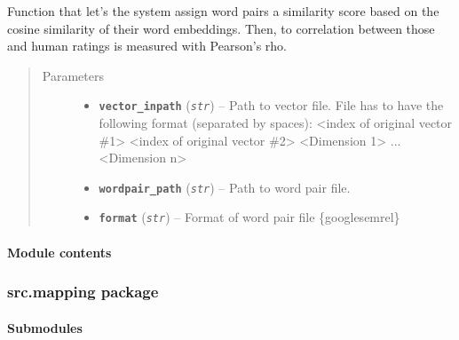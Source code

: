 \documentclass[letterpaper,10pt,english]{sphinxmanual}
\begin{document}
\begin{fulllineitems}
\label{src.eval:src.eval.word_similarity.word_sim_eval}
Function that let's the system assign word pairs a similarity score based on the cosine similarity of their word
embeddings. Then, to correlation between those and human ratings is measured with Pearson's rho.
\begin{quote}\begin{description}
\item[{Parameters}] \leavevmode\begin{itemize}
\item {} 
\textbf{\texttt{vector\_inpath}} (\emph{\texttt{str}}) -- Path to vector file. File has to have the following format (separated by spaces):
\textless{}index of original vector \#1\textgreater{} \textless{}index of original vector \#2\textgreater{} \textless{}Dimension 1\textgreater{} ... \textless{}Dimension n\textgreater{}

\item {} 
\textbf{\texttt{wordpair\_path}} (\emph{\texttt{str}}) -- Path to word pair file.

\item {} 
\textbf{\texttt{format}} (\emph{\texttt{str}}) -- Format of word pair file \{google\textbar{}semrel\}

\end{itemize}

\end{description}\end{quote}

\end{fulllineitems}



\paragraph{Module contents}
\label{src.eval:module-src.eval}\label{src.eval:module-contents}

\subsubsection{src.mapping package}
\label{src.mapping::doc}\label{src.mapping:src-mapping-package}

\paragraph{Submodules}
\label{src.mapping:submodules}
\end{document}
